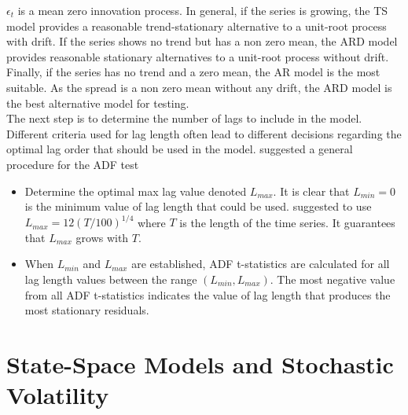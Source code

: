 \documentclass[11pt,a4,twosided,singlespacing,titlepagenumber=on]{scrreprt}
\numberwithin{equation}{chapter} %
\theoremstyle{remark}
\begin{document}
$\epsilon_t$ is a mean zero innovation process. In general, if the series is growing, the TS model provides a reasonable trend-stationary alternative to a unit-root process with drift. If the series shows no trend but has a non zero mean, the ARD model provides reasonable stationary alternatives to a unit-root process without drift. Finally, if the series has no trend and a zero mean, the AR model is the most suitable. As the spread is a non zero mean without any drift, the ARD model is the best alternative model for testing. \\

The next step is to determine the number of lags to include in the model. Different criteria used for lag length often lead to different decisions regarding the optimal lag order that should be used in the model. \cite{daoimpact} suggested a general procedure for the ADF test
\begin{itemize}
\item Determine the optimal max lag value denoted $L_{max}$. It is clear that $L_{min} = 0$ is the minimum value of lag length that could be used. \cite{schwert2002} suggested to use $L_{max} = 12 \left(T / 100 \right)^{1/4}$ where $T$ is the length of the time series. It guarantees that $L_{max}$ grows with $T$.
\item When $L_{min}$ and $L_{max}$ are established, ADF t-statistics are calculated for all lag length values between the range $(L_{min}, L_{max})$. The most negative value from all ADF t-statistics indicates the value of lag length that produces the most stationary residuals.
\end{itemize}

\chapter{State-Space Models and Stochastic Volatility}
\end{document}
